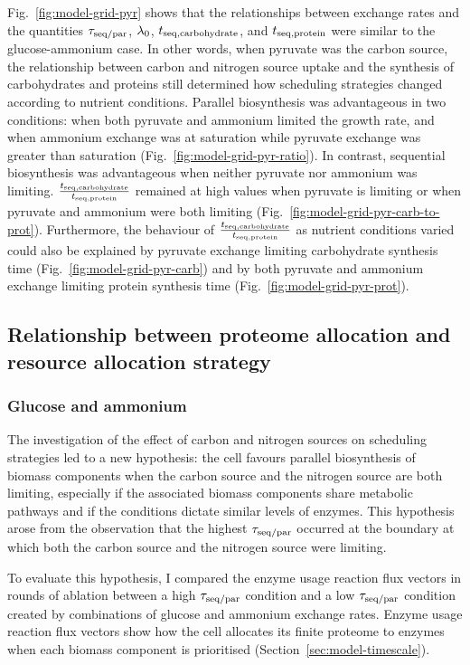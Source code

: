 Fig.\ \ref{fig:model-grid-pyr} shows that the relationships between exchange rates and the quantities $\tau_{\mathrm{seq}/\mathrm{par}}$, $\lambda_{0}$, $t_{\mathrm{seq},\mathrm{carbohydrate}}$, and $t_{\mathrm{seq},\mathrm{protein}}$ were similar to the glucose-ammonium case.
In other words, when pyruvate was the carbon source, the relationship between carbon and nitrogen source uptake and the synthesis of carbohydrates and proteins still determined how scheduling strategies changed according to nutrient conditions.
Parallel biosynthesis was advantageous in two conditions: when both pyruvate and ammonium limited the growth rate, and when ammonium exchange was at saturation while pyruvate exchange was greater than saturation (Fig.\ \ref{fig:model-grid-pyr-ratio}).
In contrast, sequential biosynthesis was advantageous when neither pyruvate nor ammonium was limiting.
$\frac{t_{\mathrm{seq},\mathrm{carbohydrate}}}{t_{\mathrm{seq},\mathrm{protein}}}$ remained at high values when pyruvate is limiting or when pyruvate and ammonium were both limiting (Fig.\ \ref{fig:model-grid-pyr-carb-to-prot}).
Furthermore, the behaviour of $\frac{t_{\mathrm{seq},\mathrm{carbohydrate}}}{t_{\mathrm{seq},\mathrm{protein}}}$ as nutrient conditions varied could also be explained by pyruvate exchange limiting carbohydrate synthesis time (Fig.\ \ref{fig:model-grid-pyr-carb}) and by both pyruvate and ammonium exchange limiting protein synthesis time (Fig.\ \ref{fig:model-grid-pyr-prot}).


\subsection{Relationship between proteome allocation and resource allocation strategy}
\label{subsec:model-rank}

\subsubsection{Glucose and ammonium}
\label{subsec:model-rank-glucose}

The investigation of the effect of carbon and nitrogen sources on scheduling strategies led to a new hypothesis: the cell favours parallel biosynthesis of biomass components when the carbon source and the nitrogen source are both limiting, especially if the associated biomass components share metabolic pathways and if the conditions dictate similar levels of enzymes.
This hypothesis arose from the observation that the highest $\tau_{\mathrm{seq}/\mathrm{par}}$ occurred at the boundary at which both the carbon source and the nitrogen source were limiting.

To evaluate this hypothesis, I compared the enzyme usage reaction flux vectors in rounds of ablation between a high $\tau_{\mathrm{seq}/\mathrm{par}}$ condition and a low $\tau_{\mathrm{seq}/\mathrm{par}}$ condition created by combinations of glucose and ammonium exchange rates.
Enzyme usage reaction flux vectors show how the cell allocates its finite proteome to enzymes when each biomass component is prioritised (Section~\ref{sec:model-timescale}).

